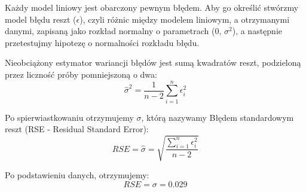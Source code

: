 \documentclass[a4paper,11pt]{article}
\begin{document}
Każdy model liniowy jest obarczony pewnym błędem. Aby go określić stwórzmy model błędu reszt (\(\epsilon\)), czyli różnic między modelem liniowym, a otrzymanymi danymi, zapisaną jako rozkład normalny o parametrach (0, \(\sigma^2\)), a następnie przetestujmy hipotezę o normalności rozkładu błędu. 

Nieobciążony estymator wariancji błędów jest sumą kwadratów reszt, podzieloną przez liczność próby pomniejszoną o dwa:
\[\hat{\sigma}^2 = \frac{1}{n-2} \sum_{i=1}^{n} \epsilon_i^2
\]

Po spierwiastkowaniu otrzymujemy \(\sigma\), którą nazywamy Błędem standardowym reszt (RSE - Residual Standard Error):
\[RSE = \hat{\sigma} = \sqrt{\frac{\sum_{i=1}^{n} \epsilon_i^2}{n-2}}
\]

Po podstawieniu danych, otrzymujemy:
\[RSE = \sigma = 0.029\]
\end{document}
